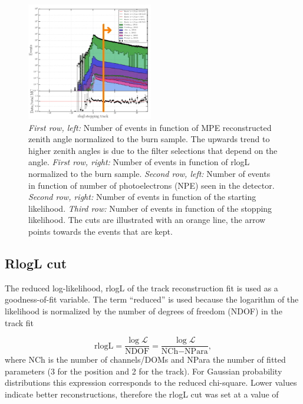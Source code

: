 \begin{figure}[ht]
\includegraphics[width=0.49\textwidth]{chapter8/img/L3_zenithcut_gr_1p4835298642_rloglcut_less_15_npecut_less_50_startingtrackcut_hs_gr_0_1D_stack_finitereco_rllh_stopping.png}
\caption{\textit{First row, left: }Number of events in function of MPE reconstructed zenith angle normalized to the burn sample. The upwards trend to higher zenith angles is due to the filter selections that depend on the angle. \textit{First row, right: }Number of events in function of rlogL normalized to the burn sample. \textit{Second row, left: }Number of events in function of number of photoelectrons (NPE) seen in the detector. \textit{Second row, right: }Number of events in function of the starting likelihood. \textit{Third row: }Number of events in function of the stopping likelihood. The cuts are illustrated with an orange line, the arrow points towards the events that are kept.}
\label{fig:level3cuts}
\end{figure}


\subsection{RlogL cut}
The reduced log-likelihood, rlogL of the track reconstruction fit is used as a goodness-of-fit variable. The term ``reduced'' is used because the logarithm of the likelihood is normalized by the number of degrees of freedom (NDOF) in the track fit

\begin{equation}
\textrm{rlogL} = \frac{\log \mathcal{L}}{\textrm{NDOF}} = \frac{\log \mathcal{L}}{\textrm{NCh} - \textrm{NPara}},
\end{equation}
where NCh is the number of channels/DOMs and NPara the number of fitted parameters (3 for the position and 2 for the track). For Gaussian probability distributions this expression corresponds to the reduced chi-square. Lower values indicate better reconstructions, therefore the rlogL cut was set at a value of 

